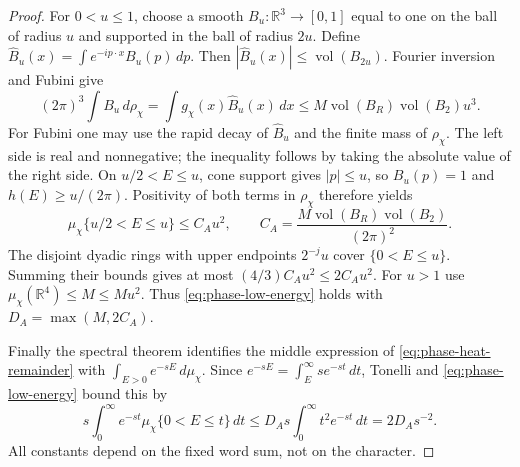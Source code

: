 \begin{proof}
For $0<u\le1$, choose a smooth $B_u:\mathbb R^3\to[0,1]$
equal to one on the ball of radius $u$ and supported in the ball of
radius $2u$. Define
$\widehat B_u(x)=\int e^{-ip\cdot x}B_u(p)\,dp$.
Then $|\widehat B_u(x)|\le\operatorname{vol}(B_{2u})$.
Fourier inversion and Fubini give
\[
 (2\pi)^3\int B_u\,d\rho_\chi
 =\int g_\chi(x)\widehat B_u(x)\,dx
 \le M\operatorname{vol}(B_R)\operatorname{vol}(B_2)u^3.
\]
For Fubini one may use the rapid decay of $\widehat B_u$ and the
finite mass of $\rho_\chi$. The left side is real and nonnegative;
the inequality follows by taking the absolute value of the right side.
On $u/2<E\le u$, cone support gives $|p|\le u$, so $B_u(p)=1$
and $h(E)\ge u/(2\pi)$. Positivity of both terms in $\rho_\chi$
therefore yields
\[
 \mu_\chi\{u/2<E\le u\}\le C_Au^2,
 \qquad
 C_A=\frac{M\operatorname{vol}(B_R)\operatorname{vol}(B_2)}{(2\pi)^2}.
\]
The disjoint dyadic rings with upper endpoints $2^{-j}u$ cover
$\{0<E\le u\}$. Summing their bounds gives at most
$(4/3)C_Au^2\le2C_Au^2$. For $u>1$ use
$\mu_\chi(\mathbb R^4)\le M\le Mu^2$.
Thus \eqref{eq:phase-low-energy} holds with $D_A=\max(M,2C_A)$.

Finally the spectral theorem identifies the middle expression of
\eqref{eq:phase-heat-remainder} with
$\int_{E>0}e^{-sE}\,d\mu_\chi$. Since
$e^{-sE}=\int_E^\infty se^{-st}\,dt$, Tonelli and
\eqref{eq:phase-low-energy} bound this by
\[
 s\int_0^\infty e^{-st}\mu_\chi\{0<E\le t\}\,dt
 \le D_As\int_0^\infty t^2e^{-st}\,dt=2D_As^{-2}.
\]
All constants depend on the fixed word sum, not on the character.
\end{proof}


